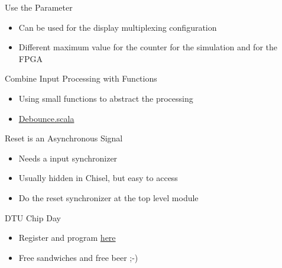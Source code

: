 \begin{frame}[fragile]{Use the Parameter}
\begin{itemize}
\item Can be used for the display multiplexing configuration
\item Different maximum value for the counter for the simulation and for the FPGA
\end{itemize}
\end{frame}


\begin{frame}[fragile]{Combine Input Processing with Functions}
\begin{itemize}
\item Using small functions to abstract the processing
\item \href{https://github.com/schoeberl/chisel-book/blob/master/src/main/scala/Debounce.scala}{Debounce.scala}
\end{itemize}
\end{frame}

\begin{frame}[fragile]{Reset is an Asynchronous Signal}
\begin{itemize}
\item Needs a input synchronizer
\item Usually hidden in Chisel, but easy to access
\item Do the reset synchronizer at the top level module
\end{itemize}
\end{frame}

\begin{frame}[fragile]{DTU Chip Day}
\begin{itemize}
\item Register and program \href{https://dtu.events/dtuchipday2025}{here}
\item Free sandwiches and free beer ;-)
\end{itemize}
\end{frame}


